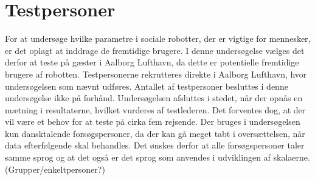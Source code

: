 \section{Testpersoner}
\label{ParametreTestpersoner}
%
For at undersøge hvilke parametre i sociale robotter, der er vigtige for mennesker, er det oplagt at inddrage de fremtidige brugere. I denne undersøgelse vælges det derfor at teste på gæster i Aalborg Lufthavn, da dette er potentielle fremtidige brugere af robotten. Testpersonerne rekrutteres direkte i Aalborg Lufthavn, hvor undersøgelsen som nævnt udføres. Antallet af testpersoner besluttes i denne undersøgelse ikke på forhånd. Undersøgelsen afsluttes i stedet, når der opnås en mætning i resultaterne, hvilket vurderes af testlederen. Det forventes dog, at der vil være et behov for at teste på cirka fem rejsende. Der bruges i undersøgelsen kun dansktalende forsøgspersoner, da der kan gå meget tabt i oversættelsen, når data efterfølgende skal behandles. Det ønskes derfor at alle forsøgspersoner taler samme sprog og at det også er det sprog som anvendes i udviklingen af skalaerne. (Grupper/enkeltpersoner?)